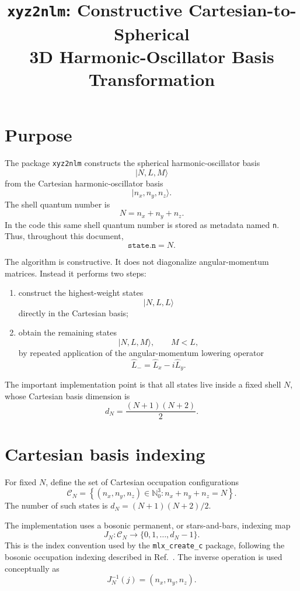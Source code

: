 \documentclass[11pt]{article}
\title{\texttt{xyz2nlm}: Constructive Cartesian-to-Spherical\\
3D Harmonic-Oscillator Basis Transformation}
\author{}
\date{}
\begin{document}
\maketitle

\section{Purpose}

The package \texttt{xyz2nlm} constructs the spherical harmonic-oscillator basis
\[
    |N,L,M\rangle
\]
from the Cartesian harmonic-oscillator basis
\[
    |n_x,n_y,n_z\rangle .
\]
The shell quantum number is
\[
    N=n_x+n_y+n_z .
\]
In the code this same shell quantum number is stored as metadata named \texttt{n}.
Thus, throughout this document,
\[
    \texttt{state.n}=N .
\]

The algorithm is constructive. It does not diagonalize angular-momentum matrices.
Instead it performs two steps:

\begin{enumerate}
    \item construct the highest-weight states
    \[
        |N,L,L\rangle
    \]
    directly in the Cartesian basis;
    \item obtain the remaining states
    \[
        |N,L,M\rangle,\qquad M<L,
    \]
    by repeated application of the angular-momentum lowering operator
    \[
        \hat L_-=\hat L_x-i\hat L_y .
    \]
\end{enumerate}

The important implementation point is that all states live inside a fixed shell
\(N\), whose Cartesian basis dimension is
\[
    d_N=\frac{(N+1)(N+2)}{2}.
\]

\section{Cartesian basis indexing}

For fixed \(N\), define the set of Cartesian occupation configurations
\[
    \mathcal C_N
    =
    \left\{
        (n_x,n_y,n_z)\in\mathbb N_0^3:
        n_x+n_y+n_z=N
    \right\}.
\]
The number of such states is \(d_N=(N+1)(N+2)/2\).

The implementation uses a bosonic permanent, or stars-and-bars, indexing map
\[
    J_N:\mathcal C_N\to \{0,1,\dots,d_N-1\}.
\]
This is the index convention used by the \texttt{mlx\_create\_c} package,
following the bosonic occupation indexing described in Ref.~\cite{arxiv09102577}.
The inverse operation is used conceptually as
\[
    J_N^{-1}(j)=(n_x,n_y,n_z).
\]
\end{document}
